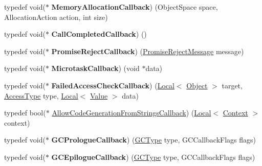 \begin{DoxyCompactItemize}
\item 
\hypertarget{namespacev8_a2402a6535cafc5f721192b300502fb0a}{}typedef void($\ast$ {\bfseries Memory\+Allocation\+Callback}) (Object\+Space space, Allocation\+Action action, int size)\label{namespacev8_a2402a6535cafc5f721192b300502fb0a}

\item 
\hypertarget{namespacev8_a8d88696ff21bd777d488605cb7714573}{}typedef void($\ast$ {\bfseries Call\+Completed\+Callback}) ()\label{namespacev8_a8d88696ff21bd777d488605cb7714573}

\item 
\hypertarget{namespacev8_a3367f6ae375d6d4b4b3f992953c135ba}{}typedef void($\ast$ {\bfseries Promise\+Reject\+Callback}) (\hyperlink{classv8_1_1_promise_reject_message}{Promise\+Reject\+Message} message)\label{namespacev8_a3367f6ae375d6d4b4b3f992953c135ba}

\item 
\hypertarget{namespacev8_a64445c32058729cdc44d56ff13458bed}{}typedef void($\ast$ {\bfseries Microtask\+Callback}) (void $\ast$data)\label{namespacev8_a64445c32058729cdc44d56ff13458bed}

\item 
\hypertarget{namespacev8_a1352a0d6e487b7092ea79e2d3d4ecd12}{}typedef void($\ast$ {\bfseries Failed\+Access\+Check\+Callback}) (\hyperlink{classv8_1_1_local}{Local}$<$ \hyperlink{classv8_1_1_object}{Object} $>$ target, \hyperlink{namespacev8_add8bef6469c5b94706584124e610046c}{Access\+Type} type, \hyperlink{classv8_1_1_local}{Local}$<$ \hyperlink{classv8_1_1_value}{Value} $>$ data)\label{namespacev8_a1352a0d6e487b7092ea79e2d3d4ecd12}

\item 
typedef bool($\ast$ \hyperlink{namespacev8_a521d909ec201742a1cb35d50a8e2a3c2}{Allow\+Code\+Generation\+From\+Strings\+Callback}) (\hyperlink{classv8_1_1_local}{Local}$<$ \hyperlink{classv8_1_1_context}{Context} $>$ context)
\item 
\hypertarget{namespacev8_a09e509ff7a94ad074420980c5f5762af}{}typedef void($\ast$ {\bfseries G\+C\+Prologue\+Callback}) (\hyperlink{namespacev8_ac109d6f27e0c0f9ef4e98bcf7a806cf2}{G\+C\+Type} type, G\+C\+Callback\+Flags flags)\label{namespacev8_a09e509ff7a94ad074420980c5f5762af}

\item 
\hypertarget{namespacev8_a4a818ae1aee0cb378a4c2037dfc4a4c2}{}typedef void($\ast$ {\bfseries G\+C\+Epilogue\+Callback}) (\hyperlink{namespacev8_ac109d6f27e0c0f9ef4e98bcf7a806cf2}{G\+C\+Type} type, G\+C\+Callback\+Flags flags)\label{namespacev8_a4a818ae1aee0cb378a4c2037dfc4a4c2}


\end{DoxyCompactItemize}
